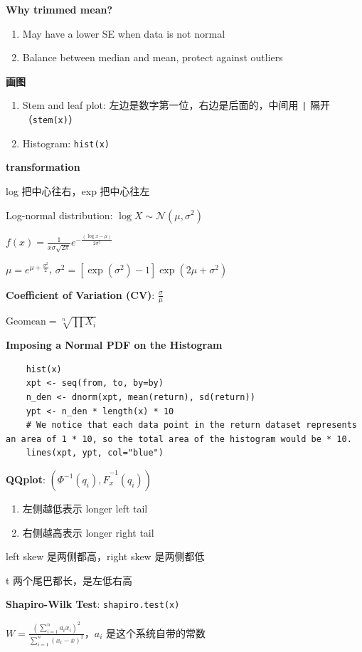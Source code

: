 \documentclass[9pt,landscape]{article}
\begin{document}
\begin{multicols}{3}
\textbf{Why trimmed mean?}
\begin{enumerate}
	\item May have a lower SE when data is not normal
	\item Balance between median and mean, protect against outliers
\end{enumerate}

\textbf{画图}
\begin{enumerate}
	\item Stem and leaf plot: 左边是数字第一位，右边是后面的，中间用 \texttt{|} 隔开（\texttt{stem(x)}）
	\item Histogram: \texttt{hist(x)}
\end{enumerate}

\textbf{transformation}

log 把中心往右，exp 把中心往左

Log-normal distribution: $\log X\sim\mathcal{N}(\mu,\sigma^2)$

$f(x)=\frac{1}{x\sigma\sqrt{2\pi}}e^{-\frac{(\log x-\mu)}{2\sigma^2}}$

$\mu=e^{\mu+\frac{\sigma^2}{2}}$, $\sigma^2=[\exp(\sigma^2)-1]\exp(2\mu+\sigma^2)$

\textbf{Coefficient of Variation (CV)}: $\frac{\sigma}{\mu}$

$\mathrm{Geomean}=\sqrt[n]{\prod X_i}$

\textbf{Imposing a Normal PDF on the Histogram}

\begin{lstlisting}
	hist(x)
	xpt <- seq(from, to, by=by)
	n_den <- dnorm(xpt, mean(return), sd(return))
	ypt <- n_den * length(x) * 10
	# We notice that each data point in the return dataset represents an area of 1 * 10, so the total area of the histogram would be * 10. 
	lines(xpt, ypt, col="blue")
\end{lstlisting}

\textbf{QQplot}: $\left(\Phi^{-1}(q_i), \hat{F}^{-1}_x(q_i)\right)$
\begin{enumerate}
	\item 左侧越低表示 longer left tail
	\item 右侧越高表示 longer right tail
\end{enumerate}

left skew 是两侧都高，right skew 是两侧都低

t 两个尾巴都长，是左低右高

\textbf{Shapiro-Wilk Test}: \texttt{shapiro.test(x)}

$W=\frac{\left(\sum_{i=1}^{n}a_ix_i\right)^2}{\sum_{i=1}^{n}(x_i-\overline{x})^2}$，$a_i$ 是这个系统自带的常数


\end{multicols}
\end{document}

